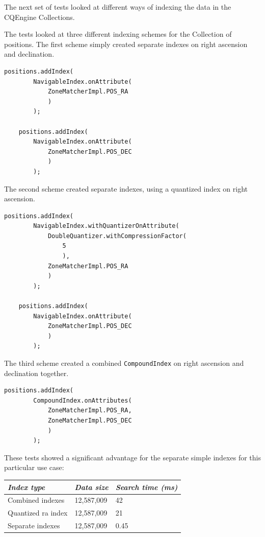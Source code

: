 \documentclass{article}
\newcommand{\cqengine} {CQEngine\xspace}
\begin{document}
The next set of tests looked at different ways of indexing the data in the \cqengine Collections.

The tests looked at three different indexing schemes for the Collection of positions. The first scheme simply created separate indexes on right ascension and declination.

\begin{lstlisting}[style=Java]
    positions.addIndex(
        NavigableIndex.onAttribute(
            ZoneMatcherImpl.POS_RA
            )
        );

    positions.addIndex(
        NavigableIndex.onAttribute(
            ZoneMatcherImpl.POS_DEC
            )
        );
\end{lstlisting}

The second scheme created separate indexes, using a quantized index on right ascension.

\begin{lstlisting}[style=Java]
    positions.addIndex(
        NavigableIndex.withQuantizerOnAttribute(
            DoubleQuantizer.withCompressionFactor(
                5
                ),
            ZoneMatcherImpl.POS_RA
            )
        );

    positions.addIndex(
        NavigableIndex.onAttribute(
            ZoneMatcherImpl.POS_DEC
            )
        );
\end{lstlisting}

The third scheme created a combined \texttt{CompoundIndex} on right ascension and declination together.

\begin{lstlisting}[style=Java]
    positions.addIndex(
        CompoundIndex.onAttributes(
            ZoneMatcherImpl.POS_RA,
            ZoneMatcherImpl.POS_DEC
            )
        );
\end{lstlisting}

These tests showed a significant advantage for the separate simple indexes for this particular use case:

\begin{table}[h]
\centering
\begin{tabular}{|l|l|l|}
\hline
\textit{Index type} & \textit{Data size} & \textit{Search time (ms)} \\ \hline
Combined indexes & 12,587,009 & 42 \\ \hline
Quantized ra index & 12,587,009 & 21 \\ \hline
Separate indexes & 12,587,009 & 0.45 \\ \hline
\end{tabular}
\end{table}
\end{document}
